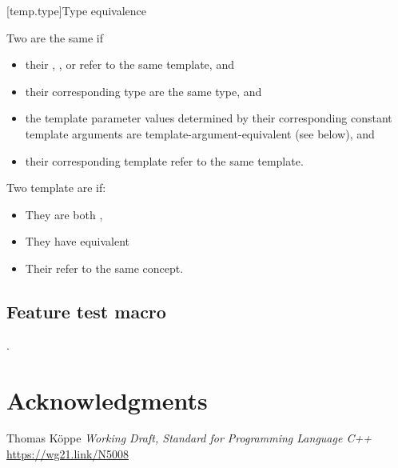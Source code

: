 \documentclass{wg21}
\begin{document}
[temp.type]{Type equivalence}

\pnum
{}%
Two  are the same if
\begin{itemize}
\item
their ,
, or
refer to the same template, and

\item
their corresponding type 
are the same type, and

\item
the template parameter values determined by
their corresponding constant template arguments
are template-argument-equivalent (see below), and

\item
their corresponding template 
refer to the same template.
\end{itemize}


\begin{addedblock}
Two template  are  if:
\begin{itemize}
\item They are both ,
\item They have equivalent 
\item Their  refer to the same concept.
\end{itemize}
\end{addedblock}



\subsection{Feature test macro}

 .



\section{Acknowledgments}




\renewcommand{\section}[2]{}%

\begin{thebibliography}{9}


Thomas Köppe
\emph{Working Draft, Standard for Programming Language C++}\newline
\url{https://wg21.link/N5008}


\end{thebibliography}
\end{document}
